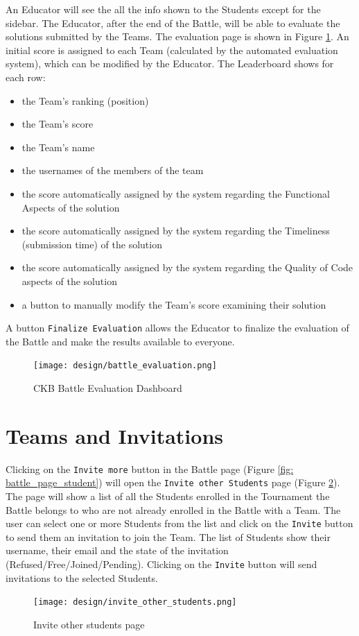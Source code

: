 An Educator will see the all the info shown to the Students except for the sidebar.
The Educator, after the end of the Battle, will be able to evaluate the solutions submitted by the Teams.
The evaluation page is shown in Figure \ref{fig: battle_eval}.
An initial score is assigned to each Team (calculated by the automated evaluation system), which can be modified by the Educator. 
The Leaderboard shows for each row:
\begin{itemize}
    \item the Team's ranking (position)
    \item the Team's score
    \item the Team's name
    \item the usernames of the members of the team
    \item the score automatically assigned by the system regarding the Functional Aspects of the solution
    \item the score automatically assigned by the system regarding the Timeliness (submission time) of the solution
    \item the score automatically assigned by the system regarding the Quality of Code aspects of the solution
    \item a button to manually modify the Team's score examining their solution
\end{itemize}
A button \verb|Finalize Evaluation| allows the Educator to finalize the evaluation of the Battle and make the results available to everyone.
\begin{figure} [H]
    \begin{center}
        \texttt{[image: design/battle\_evaluation.png]}
        \caption{CKB Battle Evaluation Dashboard}
        \label{fig: battle_eval}
    \end{center}
\end{figure}




\section{Teams and Invitations}
\label{sec: teams_invitations}%

Clicking on the \verb|Invite more| button in the Battle page (Figure \ref{fig: battle_page_student}) will open the \verb|Invite other Students| page (Figure \ref{fig: invite_others}).
The page will show a list of all the Students enrolled in the Tournament the Battle belongs to who are not already enrolled in the Battle with a Team. 
The user can select one or more Students from the list and click on the \verb|Invite| button to send them an invitation to join the Team. 
The list of Students show their username, their email and the state of the invitation (Refused/Free/Joined/Pending).
Clicking on the \verb|Invite| button will send invitations to the selected Students.
\begin{figure} [H]
    \begin{center}
        \texttt{[image: design/invite\_other\_students.png]}
        \caption{Invite other students page}
        \label{fig: invite_others}
    \end{center}
\end{figure}


